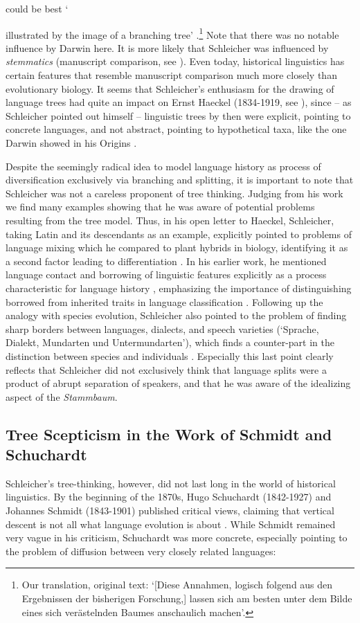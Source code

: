 \documentclass[svgnames,12pt]{scrartcl}
\begin{document}
could be best `{illustrated by the image of a branching tree'
\citep[787]{Schleicher1853}.\footnote{Our translation, original text: `[Diese Annahmen, logisch
folgend aus den Ergebnissen der bisherigen Forschung,] lassen sich am besten unter dem Bilde eines
sich verästelnden Baumes anschaulich machen'.} Note that there was no notable influence by Darwin
here. It is more likely that Schleicher was influenced by \emph{stemmatics} (manuscript comparison,
see \citealt[8]{Hoenigswald1963}). Even today, historical linguistics has certain features that
resemble manuscript comparison much more closely than evolutionary biology. It seems that
Schleicher's enthusiasm for the drawing of language trees had quite an impact on Ernst Haeckel
(1834-1919, see \citealt{Sutrop2012}), since – as Schleicher pointed out himself
\citep[14]{Schleicher1863} – linguistic trees by then were explicit, pointing to concrete
languages, and not abstract, pointing to hypothetical taxa, like the one Darwin showed in his
Origins \citep{Darwin1859}.
 
Despite the seemingly radical idea to model language history as process of diversification
exclusively via branching and splitting, it is important to note that Schleicher was not a careless
proponent of tree thinking. Judging from his work we find many examples showing that he was aware of
potential problems resulting from the tree model. Thus, in his open letter to Haeckel, Schleicher,
taking Latin and its descendants as an example, explicitly pointed to problems of language mixing
which he compared to plant hybrids in biology, identifying it as a second factor leading to
differentiation \citep[18]{Schleicher1863}. 
In his earlier work, he mentioned language contact and
borrowing of linguistic features explicitly as a process characteristic for language history \citep[6]{Schleicher1861}, emphasizing the importance of
distinguishing borrowed from inherited traits in language classification \citep[30]{Schleicher1848}.
Following up the analogy with species evolution, Schleicher also pointed to the problem of finding
sharp borders between languages, dialects, and speech varieties (`Sprache, Dialekt, Mundarten und
Untermundarten'), which finds a counter-part in the distinction between species and
individuals \citep[21]{Schleicher1863}. Especially this last point clearly reflects
that Schleicher did not exclusively think that
language splits were a product of abrupt separation of speakers, and that he was aware of the
idealizing aspect of the \emph{Stammbaum}.

\subsection{Tree Scepticism in the Work of Schmidt and Schuchardt}
Schleicher's tree-thinking, however, did not last long in the world of historical linguistics.
By the beginning of the 1870s, Hugo Schuchardt (1842-1927) and Johannes Schmidt (1843-1901) published
critical views, claiming that vertical descent is not all what language evolution is about
\citep{Schmidt1872,Schuchardt1870}. While Schmidt remained very vague in his criticism, Schuchardt
was more concrete, especially pointing to the problem of diffusion
between very closely related languages: 

}
\end{document}
